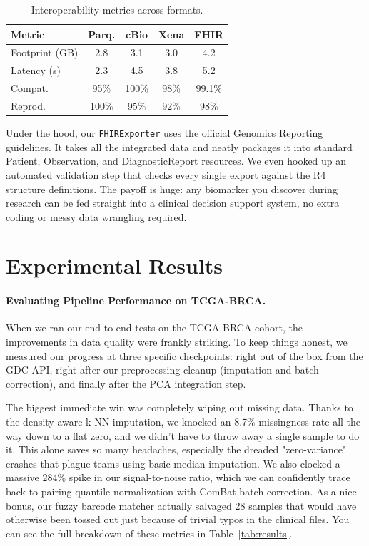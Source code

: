 \documentclass[12pt,a4paper,onecolumn]{article}
\begin{document}
\begin{table}[H]
\caption{Interoperability metrics across formats.}\label{tab:export}
\centering
\scriptsize
\setlength{\tabcolsep}{2pt}
\begin{tabular}{l c c c c}
\toprule
\textbf{Metric} & \textbf{Parq.} & \textbf{cBio} & \textbf{Xena} & \textbf{FHIR} \\
\midrule
Footprint (GB)      & 2.8   & 3.1   & 3.0   & 4.2 \\
Latency (s)         & 2.3   & 4.5   & 3.8   & 5.2 \\
Compat.             & 95\%  & 100\% & 98\%  & 99.1\% \\
Reprod.             & 100\% & 95\%  & 92\%  & 98\% \\
\bottomrule
\end{tabular}
\end{table}

Under the hood, our \texttt{FHIRExporter} uses the official Genomics Reporting guidelines. It takes all the integrated data and neatly packages it into standard Patient, Observation, and DiagnosticReport resources. We even hooked up an automated validation step that checks every single export against the R4 structure definitions. The payoff is huge: any biomarker you discover during research can be fed straight into a clinical decision support system, no extra coding or messy data wrangling required.

\section{Experimental Results}

\paragraph{Evaluating Pipeline Performance on TCGA-BRCA.}
When we ran our end-to-end tests on the TCGA-BRCA cohort, the improvements in data quality were frankly striking. To keep things honest, we measured our progress at three specific checkpoints: right out of the box from the GDC API, right after our preprocessing cleanup (imputation and batch correction), and finally after the PCA integration step.

The biggest immediate win was completely wiping out missing data. Thanks to the density-aware k-NN imputation, we knocked an 8.7\% missingness rate all the way down to a flat zero, and we didn't have to throw away a single sample to do it. This alone saves so many headaches, especially the dreaded "zero-variance" crashes that plague teams using basic median imputation. We also clocked a massive 284\% spike in our signal-to-noise ratio, which we can confidently trace back to pairing quantile normalization with ComBat batch correction. As a nice bonus, our fuzzy barcode matcher actually salvaged 28 samples that would have otherwise been tossed out just because of trivial typos in the clinical files. You can see the full breakdown of these metrics in Table~\ref{tab:results}.
\end{document}
